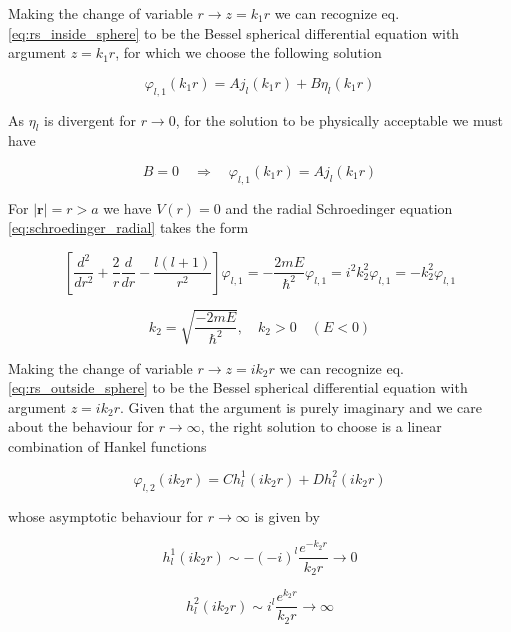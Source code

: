 \documentclass{article}
\begin{document}
Making the change of variable \( r \rightarrow z = k_1r \) we can recognize eq. \eqref{eq:rs_inside_sphere} to be the Bessel spherical differential equation with argument \(z = k_1 r\), for which we choose the following solution

\begin{equation}
\varphi_{l,1}(k_1r) = A j_l(k_1r) + B \eta_l(k_1r)
\end{equation}

As \( \eta_l \) is divergent for \( r \rightarrow 0 \), for the solution to be physically acceptable we must have

\begin{equation}
B = 0 \quad \Rightarrow \quad \varphi_{l,1}(k_1r) = A j_l(k_1r)
\end{equation}

For \( \left| \bm{r} \right| = r > a \) we have \( V(r) = 0 \) and the radial Schroedinger equation \eqref{eq:schroedinger_radial} takes the form

\begin{equation}
\label{eq:rs_outside_sphere}
\left[ \frac{d^2}{dr^2} + \frac{2}{r} \frac{d}{dr} - \frac{l \left(l+1 \right)}{r^2} \right] \varphi_{l,1} = - \frac{2mE}{\hbar^2} \varphi_{l,1} = i^2 k_2^2 \varphi_{l,1} = - k_2^2 \varphi_{l,1}
\end{equation}

\begin{equation}
k_2 = \sqrt{\frac{-2mE}{\hbar^2}}, \quad k_2 > 0 \quad (E<0)
\end{equation}

Making the change of variable \( r \rightarrow z = i k_2 r \) we can recognize eq. \eqref{eq:rs_outside_sphere} to be the Bessel spherical differential equation with argument \(z = i k_2 r\). Given that the argument is purely imaginary and we care about the behaviour for \( r \rightarrow \infty \), the right solution to choose is a linear combination of Hankel functions

\begin{equation}
\varphi_{l,2}(ik_2r) = C h_l^1(ik_2r) + D h_l^2(ik_2r)
\end{equation} 

whose asymptotic behaviour for \( r \rightarrow \infty \) is given by

\begin{equation}
h_l^1(ik_2r) \sim -(-i)^l \frac{e^{-k_2r}}{k_2r} \rightarrow 0
\end{equation}

\begin{equation}
\label{eq:h2_asymptotic}
h_l^2(ik_2r) \sim i^l \frac{e^{k_2r}}{k_2r} \rightarrow \infty
\end{equation}
\end{document}
